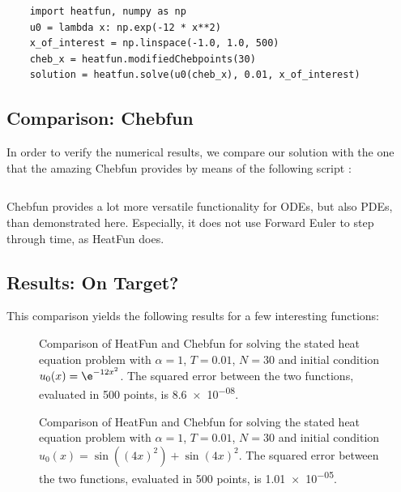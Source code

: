 \documentclass[12pt, a4paper]{article}
\newcommand{\heatfun}{\textcolor{themecolor3}{HeatFun}\xspace}
\begin{document}
  \begin{verbatim}
    import heatfun, numpy as np
    u0 = lambda x: np.exp(-12 * x**2)
    x_of_interest = np.linspace(-1.0, 1.0, 500)
    cheb_x = heatfun.modifiedChebpoints(30)
    solution = heatfun.solve(u0(cheb_x), 0.01, x_of_interest)
  \end{verbatim}

  \subsection{Comparison: Chebfun}
  In order to verify the numerical results, we compare our solution with the one that the amazing Chebfun provides by means of the following script \parencite{exploring}:
  \inputminted{matlab}{../analysis/heatfun.m}

  Chebfun provides a lot more versatile functionality for ODEs, but also PDEs, than demonstrated here.
  Especially, it does not use Forward Euler to step through time, as \heatfun does.


  \pagebreak
  \subsection{Results: On Target?}
  This comparison yields the following results for a few interesting functions:

  \begin{figure}[H]
    \centering
    \caption{Comparison of \heatfun and Chebfun for solving the stated heat equation problem with $\alpha = 1$, $T = 0.01$, $N = 30$ and initial condition $u_0(x) = \e^{-12 x^2}$. The squared error between the two functions, evaluated in 500 points, is \num{8.6e-08}.}
  \end{figure}

  \begin{figure}[H]
    \centering
    \caption{Comparison of \heatfun and Chebfun for solving the stated heat equation problem with $\alpha = 1$, $T = 0.01$, $N = 30$ and initial condition $u_0(x) = \sin((4x)^2) + \sin(4x)^2$. The squared error between the two functions, evaluated in 500 points, is \num{1.01e-05}.}
  \end{figure}
\end{document}
